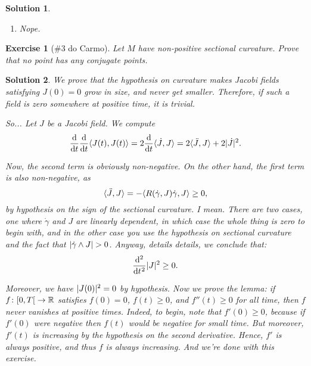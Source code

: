 \documentclass{article}
\theoremstyle{plain}
\newtheorem*{ex}{Exercise}
\theoremstyle{nonumberplain}
\newtheorem{sol}{Solution}
\newcommand{\R}{\mathbb{R}}
\DeclarePairedDelimiter{\abs}{\lvert}{\rvert}
\DeclarePairedDelimiter{\norm}{\lvert}{\rvert}
\DeclarePairedDelimiter{\braket}{\langle}{\rangle}
\begin{document}
\begin{sol}
\begin{enumerate}
\item Nope.
\end{enumerate}
\end{sol}

\begin{ex}[\#3 do Carmo]
Let $M$ have non-positive sectional curvature. Prove that no point has any conjugate points.
\end{ex}

\begin{sol}
We prove that the hypothesis on curvature makes Jacobi fields satisfying $J(0) = 0$ grow in size, and never get smaller. Therefore, if such a field is zero somewhere at positive time, it is trivial.

So... Let $J$ be a Jacobi field. We compute
\begin{equation}
\diff{}t \diff{}t \braket{J(t), J(t)} = 2 \diff{}t \braket{\dot J, J} = 2 \braket{\ddot J, J} + 2 \norm{\dot J}^2.
\end{equation}

Now, the second term is obviously non-negative. On the other hand, the first term is also non-negative, as
\begin{equation}
\braket{\ddot J, J} =  - \braket{R(\dot\gamma, J) \dot\gamma, J} \geq 0,
\end{equation}
by hypothesis on the sign of the sectional curvature. I mean. There are two cases, one where $\dot\gamma$ and $J$ are linearly dependent, in which case the whole thing is zero to begin with, and in the other case you use the hypothesis on sectional curvature and the fact that $\abs{\dot\gamma \wedge J} > 0$. Anyway, details details, we conclude that:
\begin{equation}
\diff[2]{}t \abs{J}^2 \geq 0.
\end{equation}

Moreover, we have $\abs{J(0)}^2 = 0$ by hypothesis. Now we prove the lemma: if $f \colon \rinterval0T \to \R$ satisfies $f(0) = 0$, $f(t) \geq 0$, and $f''(t) \geq 0$ for all time, then $f$ never vanishes at positive times. Indeed, to begin, note that $f'(0) \geq 0$, because if $f'(0)$ were negative then $f(t)$ would be negative for small time. But moreover, $f'(t)$ is increasing by the hypothesis on the second derivative. Hence, $f'$ is always positive, and thus $f$ is always increasing. And we're done with this exercise.
\end{sol}
\end{document}
